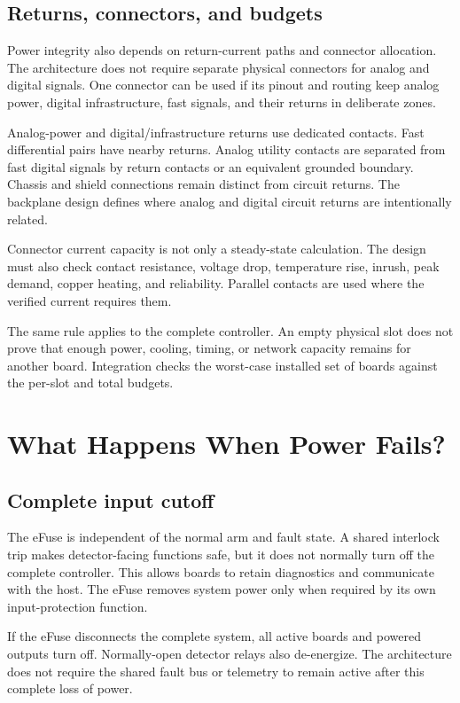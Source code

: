 \subsection{Returns, connectors, and budgets}

Power integrity also depends on return-current paths and connector allocation. The architecture does not require separate physical connectors for analog and digital signals. One connector can be used if its pinout and routing keep analog power, digital infrastructure, fast signals, and their returns in deliberate zones.

Analog-power and digital/infrastructure returns use dedicated contacts. Fast differential pairs have nearby returns. Analog utility contacts are separated from fast digital signals by return contacts or an equivalent grounded boundary. Chassis and shield connections remain distinct from circuit returns. The backplane design defines where analog and digital circuit returns are intentionally related.

Connector current capacity is not only a steady-state calculation. The design must also check contact resistance, voltage drop, temperature rise, inrush, peak demand, copper heating, and reliability. Parallel contacts are used where the verified current requires them.

The same rule applies to the complete controller. An empty physical slot does not prove that enough power, cooling, timing, or network capacity remains for another board. Integration checks the worst-case installed set of boards against the per-slot and total budgets.

\section{What Happens When Power Fails?}

\subsection{Complete input cutoff}
The eFuse is independent of the normal arm and fault state. A shared interlock trip makes detector-facing functions safe, but it does not normally turn off the complete controller. This allows boards to retain diagnostics and communicate with the host. The eFuse removes system power only when required by its own input-protection function.

If the eFuse disconnects the complete system, all active boards and powered outputs turn off. Normally-open detector relays also de-energize. The architecture does not require the shared fault bus or telemetry to remain active after this complete loss of power.

